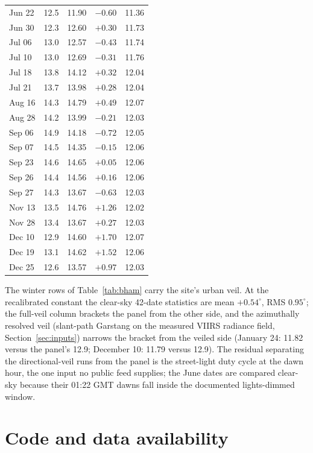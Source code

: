 \documentclass[preprint,12pt]{elsarticle}
\begin{document}
\begin{table}[h]
\begin{tabular}{lcccc}
Jun 22 & 12.5 & 11.90 & $-0.60$ & 11.36 \\
Jun 30 & 12.3 & 12.60 & $+0.30$ & 11.73 \\
Jul 06 & 13.0 & 12.57 & $-0.43$ & 11.74 \\
Jul 10 & 13.0 & 12.69 & $-0.31$ & 11.76 \\
Jul 18 & 13.8 & 14.12 & $+0.32$ & 12.04 \\
Jul 21 & 13.7 & 13.98 & $+0.28$ & 12.04 \\
Aug 16 & 14.3 & 14.79 & $+0.49$ & 12.07 \\
Aug 28 & 14.2 & 13.99 & $-0.21$ & 12.03 \\
Sep 06 & 14.9 & 14.18 & $-0.72$ & 12.05 \\
Sep 07 & 14.5 & 14.35 & $-0.15$ & 12.06 \\
Sep 23 & 14.6 & 14.65 & $+0.05$ & 12.06 \\
Sep 26 & 14.4 & 14.56 & $+0.16$ & 12.06 \\
Sep 27 & 14.3 & 13.67 & $-0.63$ & 12.03 \\
Nov 13 & 13.5 & 14.76 & $+1.26$ & 12.02 \\
Nov 28 & 13.4 & 13.67 & $+0.27$ & 12.03 \\
Dec 10 & 12.9 & 14.60 & $+1.70$ & 12.07 \\
Dec 19 & 13.1 & 14.62 & $+1.52$ & 12.06 \\
Dec 25 & 12.6 & 13.57 & $+0.97$ & 12.03 \\
\bottomrule
\end{tabular}
\end{table}

The winter rows of Table~\ref{tab:bham} carry the site's urban veil.
At the recalibrated constant the clear-sky 42-date statistics are mean
$+0.54^{\circ}$, RMS $0.95^{\circ}$; the full-veil column brackets
the panel from the other side, and the azimuthally resolved veil
(slant-path Garstang on the measured VIIRS radiance field,
Section~\ref{sec:inputs}) narrows the bracket from the veiled side
(January 24: 11.82 versus the panel's 12.9; December 10: 11.79 versus
12.9). The residual separating the directional-veil runs from the
panel is the street-light duty cycle at the dawn hour, the one input
no public feed supplies; the June dates are compared clear-sky because
their 01:22 GMT dawns fall inside the documented lights-dimmed
window.

\section*{Code and data availability}
\end{document}
